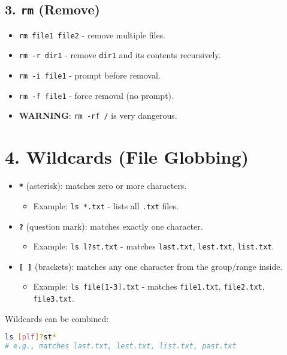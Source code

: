 \documentclass[a4paper]{report}
\begin{document}
\subsection*{3. \texttt{rm} (Remove)}
\begin{itemize}
    \item \texttt{rm file1 file2} \text{-}- remove multiple files.
    \item \texttt{rm -r dir1} \text{-}- remove \texttt{dir1} and its contents recursively.
    \item \texttt{rm -i file1} \text{-}- prompt before removal.
    \item \texttt{rm -f file1} \text{-}- force removal (no prompt).
    \item \textbf{WARNING}: \texttt{rm -rf /} is very dangerous.
\end{itemize}

\section*{4. Wildcards (File Globbing)}
\begin{itemize}
    \item \textbf{\texttt{*}} (asterisk): matches zero or more characters.
    \begin{itemize}
        \item Example: \texttt{ls *.txt} \text{-}- lists all \texttt{.txt} files.
    \end{itemize}
    \item \textbf{\texttt{?}} (question mark): matches exactly one character.
    \begin{itemize}
        \item Example: \texttt{ls l?st.txt} \text{-}- matches \texttt{last.txt}, \texttt{lest.txt}, \texttt{list.txt}.
    \end{itemize}
    \item \textbf{\texttt{[ ]}} (brackets): matches any one character from the group/range inside.
    \begin{itemize}
        \item Example: \texttt{ls file[1-3].txt} \text{-}- matches \texttt{file1.txt}, \texttt{file2.txt}, \texttt{file3.txt}.
    \end{itemize}
\end{itemize}
Wildcards can be combined:

\begin{lstlisting}[language=bash]
ls [plf]?st*
# e.g., matches last.txt, lest.txt, list.txt, past.txt
\end{lstlisting}
\end{document}
